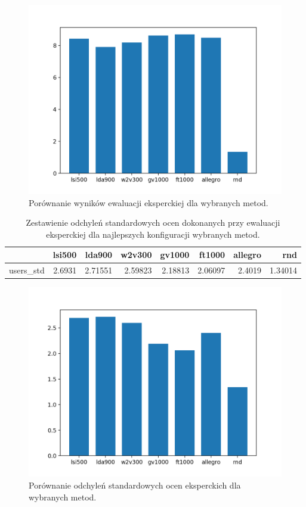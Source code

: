 \documentclass[pl]{minipw} %
\begin{document}
\begin{figure}[H]
	\centering
	\includegraphics[width=1\textwidth]{img/results/lsi500_lda900_w2v300_gv1000_ft1000_allegro_rnd_users.png}
	\caption{Porównanie wyników ewaluacji eksperckiej dla wybranych metod.}
\end{figure}




\begin{table}
	\centering
	\begin{tabular}{lrrrrrrr}
		\hline
		&   lsi500 &   lda900 &   w2v300 &   gv1000 &   ft1000 &   allegro &     rnd \\
		\hline
		users\_std &   2.6931 &  2.71551 &  2.59823 &  2.18813 &  2.06097 &    2.4019 & 1.34014 \\
		\hline
	\end{tabular}
	\caption{Zestawienie odchyleń standardowych ocen dokonanych przy ewaluacji eksperckiej dla najlepszych konfiguracji wybranych metod.}
\end{table}

\begin{figure}[H]
	\centering
	\includegraphics[width=1\textwidth]{img/results/lsi500_lda900_w2v300_gv1000_ft1000_allegro_rnd_users_std.png}
	\caption{Porównanie odchyleń standardowych ocen eksperckich dla wybranych metod.}
\end{figure}
\end{document}
